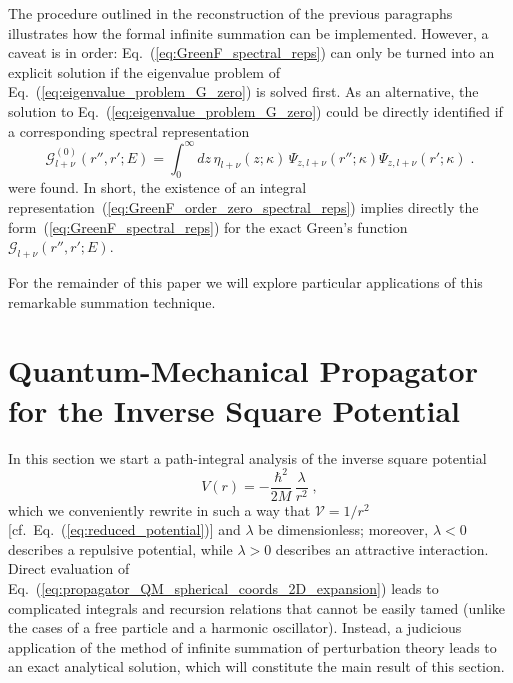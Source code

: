 \documentclass[a4paper,preprint,draft,showpacs,amsmath,amsfonts,amssymb,aps,prd]{revtex4}%
\begin{document}
The procedure outlined in the reconstruction of the previous paragraphs
illustrates how the formal infinite summation can be implemented.
However, a caveat is in order:
Eq.~(\ref{eq:GreenF_spectral_reps}) 
can only be turned into an explicit solution
if the eigenvalue problem
of Eq.~(\ref{eq:eigenvalue_problem_G_zero}) is solved first.
As an alternative,
the solution to Eq.~(\ref{eq:eigenvalue_problem_G_zero}) 
could be directly identified if a corresponding spectral representation
\begin{equation}
 {\mathcal G}^{(0)}_{l+\nu} 
(r'',r';E) 
=
\int_{0}^{\infty}  
dz
\,
\eta_{l+\nu}(z;\kappa)
\,
\Psi_{z,l+\nu} (r'';\kappa) \Psi_{z,l+\nu} (r';\kappa)
\;   .
\label{eq:GreenF_order_zero_spectral_reps}
\end{equation} 
were found.
In short, 
the existence of an integral representation~(\ref{eq:GreenF_order_zero_spectral_reps})
implies directly the form~(\ref{eq:GreenF_spectral_reps})
for the exact Green's function 
$ {\mathcal G}_{l+\nu} 
(r'',r';E) $.

For the remainder of this paper we will explore particular applications 
of this remarkable summation technique.



\section{Quantum-Mechanical Propagator for the Inverse Square Potential}
\label{sec:ISP}


In this section we start a path-integral analysis of the
inverse square potential 
\begin{equation}
V ( r ) = - \frac{\hbar^{2}}{2M}\, \frac{\lambda}{ r^{2} } 
\;  ,
\label{eq:ISP}
\end{equation}
which we conveniently rewrite in such a way that 
${\mathcal V}= 1/r^{2}$ [cf.\ Eq.~(\ref{eq:reduced_potential})]
and
$\lambda$ be dimensionless; 
moreover, $\lambda <0$ describes a repulsive potential, while 
$\lambda >0$ describes an attractive interaction.
Direct evaluation of Eq.~(\ref{eq:propagator_QM_spherical_coords_2D_expansion}) 
leads to complicated integrals and recursion relations that cannot be easily tamed
(unlike the cases of a free particle and a harmonic oscillator). Instead,
a judicious application of the method of infinite summation of perturbation theory
leads to an exact analytical solution, which will constitute the main result of this section.
\end{document}
